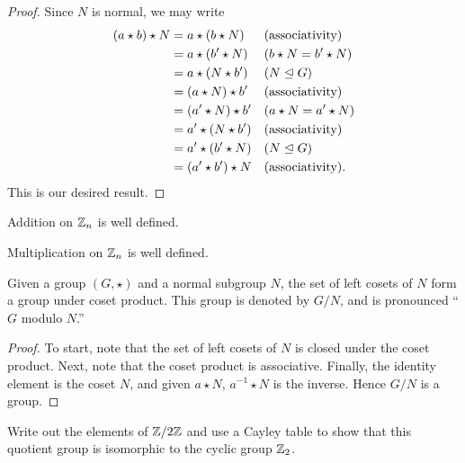 \documentclass{ximera}
\begin{document}
\begin{lemma}
\begin{proof}
    Since $N$ is normal, we may write
    \begin{align*}
    (a\star b) \star N &= a\star(b\star N) & &\text{(associativity)}\\
    &= a\star ( b'\star N ) & &\text{($b\star N = b'\star N$)} \\
    &= a\star (N\star b') & &\text{($N\trianglelefteq G$)}\\
    &= (a\star N) \star b' & &\text{(associativity)}\\
    &= (a'\star N) \star b' & &\text{($a\star N = a'\star N$)} \\
    &= a' \star (N\star b') & &\text{(associativity)}\\
    &= a'\star (b'\star N) & &\text{($N\trianglelefteq G$)}\\
    &= (a'\star b')\star N & &\text{(associativity)}.
    \end{align*}
    This is our desired result.
  \end{proof}
\end{lemma}

\begin{corollary}
  Addition on $\mathbb Z_n$ is well defined.
\end{corollary}


\begin{corollary}
  Multiplication on $\mathbb Z_n$ is well defined.
\end{corollary}


\begin{theorem}
  Given a group $(G,\star)$ and a normal subgroup $N$, the set of left
  cosets of $N$ form a group under coset product. This group is
  denoted by $G/N$, and is pronounced ``$G$ modulo $N$.''
  \begin{proof}
    To start, note that the set of left cosets of $N$ is closed under
    the coset product. Next, note that the coset product is
    associative. Finally, the identity element is the coset $N$, and
    given $a\star N$, $a^{-1}\star N$ is the inverse. Hence $G/N$ is a
    group.
  \end{proof}
\end{theorem}

\begin{exercise}
  Write out the elements of $\mathbb Z/2\mathbb Z$ and use a Cayley table to show
  that this quotient group is isomorphic to the cyclic group $\mathbb Z_2$.
\end{exercise}
\end{document}
